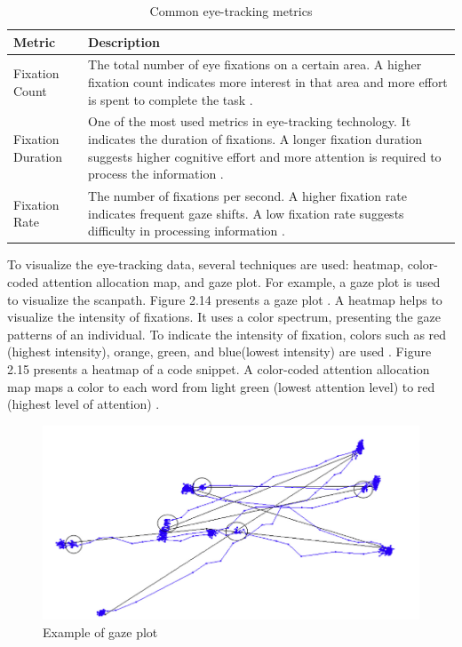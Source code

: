 \begin{table}[H]
\centering
\small %
\caption{Common eye-tracking metrics}
\label{tab:eye_tracking_metrics}
\begin{tabular}{p{} | p{}}
\hline
\rule{0pt}{1.2em}\textbf{Metric} & \textbf{Description} \\[0.5em]
\hline
\rule{0pt}{1.2em}Fixation Count & The total number of eye fixations on a certain area. A higher fixation count indicates more interest in that area and more effort is spent to complete the task \cite{obaidellah2018survey}. \\[0.5em]
\hline
\rule{0pt}{1.2em}Fixation Duration & One of the most used metrics in eye-tracking technology. It indicates the duration of fixations. A longer fixation duration suggests higher cognitive effort and more attention is required to process the information \cite{junior5005089understanding}. \\[0.5em]
\hline
\rule{0pt}{1.2em}Fixation Rate & The number of fixations per second. A higher fixation rate indicates frequent gaze shifts. A low fixation rate suggests difficulty in processing information \cite{bauer2017indentations}. \\[0.5em]
\hline
\end{tabular}
\end{table}






To visualize the eye-tracking data, several techniques are used: heatmap, color-coded attention allocation map, and gaze plot. For example, a gaze plot is used to visualize the scanpath. Figure 2.14 presents a gaze plot \cite{sharafi2015systematic}. A heatmap helps to visualize the intensity of fixations. It uses a color spectrum, presenting the gaze patterns of an individual. 
To indicate the intensity of fixation, colors such as red (highest intensity), orange, green, and blue(lowest intensity) are used \cite{sharafi2015systematic}. Figure 2.15 presents a heatmap of a code snippet.  A color-coded attention allocation map maps a color to each word from light green (lowest attention level) to red (highest level of attention) \cite{sharafi2015systematic}.


\begin{figure} [H]
  \centering
  \includegraphics[scale=0.8]{figures/gaze.png}
  \caption{Example of gaze plot \cite[p. 9]{blignaut2019visualization}}
  \label{fig:AnhangsChor}
\end{figure}


